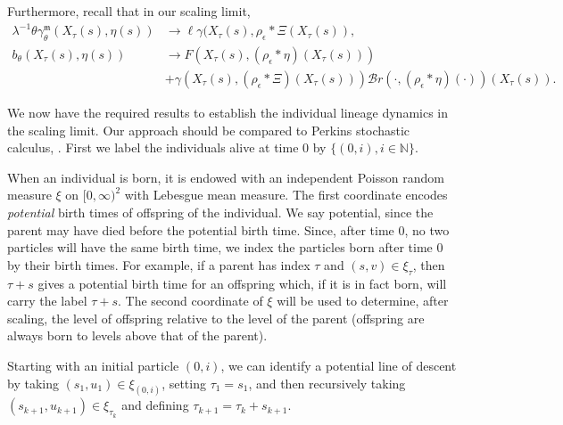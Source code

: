\documentclass[12pt]{article}
\newcommand{\IN}{\mathbb N}
\begin{document}
Furthermore, recall that in our scaling limit, 
\begin{equation}
\begin{aligned}
\lambda^{-1} \theta \gamma^{\mathfrak{m}}_{\theta}(X_{\tau}(s), \eta(s)) &\to \ell \gamma(X_{\tau}(s),\rho_\epsilon*\Xi(X_{\tau}(s)),\\
b_{\theta}(X_{\tau}(s),\eta(s)) &\to  F(X_{\tau}(s), (\rho_{\epsilon}*\eta)(X_{\tau}(s)))\\
&+\gamma(X_{\tau}(s), (\rho_{\epsilon}*\Xi)(X_{\tau}(s)))\mathcal{B}r(\cdot,(\rho_{\epsilon}*\eta)(\cdot))(X_{\tau}(s)).
\end{aligned}    
\end{equation}

We now have the required results to establish the individual lineage dynamics in the scaling limit. Our approach should be compared to Perkins stochastic calculus,
\cite{perkins:1995}. First we label the individuals alive at time $0$
by $\{(0,i), i\in\IN\}$. 

When an individual is born, it is endowed with an
independent Poisson random measure $\xi$ on $[0,\infty)^2$ with Lebesgue
mean measure. The first coordinate encodes {\em potential} birth times of 
offspring of the individual. We say potential, since the parent may have
died before the potential birth time. 
Since, after time $0$, no two particles will have the same birth
time, we index the particles born after time $0$ by 
their birth times.  
For example, if a parent has index $\tau$ and $(s,v)\in \xi_\tau$, then 
$\tau +s$ gives a potential birth time for an offspring which, if
it is in fact born, will carry
the label $\tau+s$. 
The second 
coordinate of $\xi$ will be used to determine, after scaling, 
the level of offspring relative to the 
level of the parent (offspring are always born to levels above that of
the parent). 

Starting with an initial particle 
$(0,i)$, we can identify a potential line of descent by 
taking $(s_1,u_1)\in\xi_{(0,i)}$, setting $\tau_1=s_1$, and then recursively 
taking $(s_{k+1},u_{k+1})\in\xi_{\tau_k}$ and defining $\tau_{k+1}
=\tau_k+s_{k+1}$.
\end{document}
